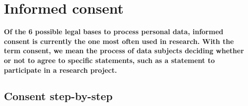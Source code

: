\documentclass[
]{book}
\begin{document}
\hypertarget{informed-consent-forms}{%
\section{Informed consent}\label{informed-consent-forms}}

\textbf{Of the 6 possible legal bases to process personal data, informed consent is
currently the one most often used in research. With the term consent, we mean
the process of data subjects deciding whether or not to agree to specific
statements, such as a statement to participate in a research project.}

\hypertarget{consent-step-by-step}{%
\subsection{Consent step-by-step}\label{consent-step-by-step}}
\end{document}
